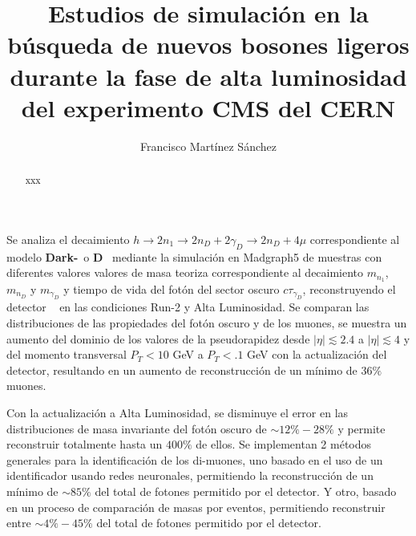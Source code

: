 \documentclass[12pt]{report}
\begin{document}
\title{Estudios de simulación en la búsqueda de nuevos bosones ligeros durante la fase de alta luminosidad del experimento CMS del CERN}
\author{Francisco Martínez Sánchez}
\maketitle
%

\begin{resumen}\thispagestyle{empty}
Se analiza el decaimiento $h \rightarrow 2n_1 \rightarrow 2n_D + 2\gamma_D \rightarrow 2n_D + 4\mu$ correspondiente al modelo \textbf{Dark-}\SUSY ~o \MSSM\textbf{D}~ mediante la simulación en \textsf{Madgraph5} de muestras con diferentes valores valores de masa teoriza correspondiente al decaimiento $m_{n_1}$, $m_{n_D}$ y $m_{\gamma_D}$ y tiempo de vida del fotón del sector oscuro $c\tau_{\gamma_D}$, reconstruyendo el detector \CMS~ en las condiciones Run-2 y Alta Luminosidad. Se comparan las distribuciones de las propiedades del fotón oscuro y de los muones, se muestra un aumento del dominio de los valores de la pseudorapidez desde $|\eta|\lesssim 2.4$ a $|\eta|\lesssim 4$ y del momento transversal $P_T<10$ GeV a $P_T<.1$ GeV con la actualización del detector, resultando en un aumento de reconstrucción de un mínimo de $36\%$ muones. 

Con la actualización a Alta Luminosidad, se disminuye el error en las distribuciones de masa invariante del fotón oscuro de $\sim 12\% - 28\%$ y permite reconstruir totalmente hasta un $400\%$ de ellos. Se implementan 2 métodos generales para la identificación de los di-muones, uno basado en el uso de un identificador usando redes neuronales, permitiendo la reconstrucción de un mínimo de $\sim 85\%$ del total de fotones permitido por el detector. Y otro, basado en un proceso de comparación de masas por eventos, permitiendo reconstruir entre $\sim 4\%-45\%$ del total de fotones permitido por el detector. 
\end{resumen}
\begin{abstract}\thispagestyle{empty}%
xxx
\end{abstract}
\end{document}
